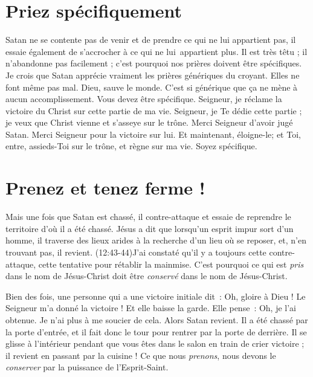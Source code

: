 \section{Priez sp\'ecifiquement}

Satan ne se contente pas de venir et de prendre ce qui ne lui appartient pas,
 il essaie également de s'accrocher à ce qui ne lui~appartient %
 plus.  Il est très têtu ; il n'abandonne pas facilement ;
 c'est pourquoi nos prières doivent être spécifiques.
 Je crois que Satan apprécie vraiment les prières génériques du croyant.
 Elles ne font même pas mal. \Og Dieu, sauve le monde. \Fg{}
 C'est si générique que ça ne mène à aucun accomplissement.
 Vous devez être spécifique. \Og Seigneur, je réclame la victoire du Christ
 sur cette partie de ma vie. Seigneur, je Te dédie cette partie ;
 je veux que Christ vienne et s'asseye sur le trône.
 Merci Seigneur d'avoir jugé Satan.
 Merci Seigneur pour la victoire sur lui.
 Et maintenant, éloigne-le;
 et Toi, entre, assieds-Toi sur le trône,
 et règne sur ma vie. \Fg{} Soyez spécifique.


\section{Prenez et tenez ferme !}

Mais une fois que Satan est chassé, il contre-attaque et essaie de reprendre
 le territoire d'où il a été chassé.
 Jésus a dit que lorsqu'un esprit impur sort d'un homme,
 il traverse des lieux arides à la recherche d'un lieu où se reposer,
 et, n'en trouvant pas, il revient.
 (12:43-44)J'ai constaté qu'il y a toujours cette contre-attaque,
 cette tentative pour rétablir la mainmise.
 C'est pourquoi ce qui est \emph{pris}
 dans le nom de Jésus-Christ doit être
 \emph{conservé} dans le nom de Jésus-Christ.

Bien des fois, une personne qui a une victoire initiale dit~:
 \Og Oh, gloire à Dieu ! Le Seigneur m'a donné la victoire ! \Fg{}
 Et elle baisse la garde. Elle pense~: \Og Oh, je l'ai obtenue.
 Je n'ai plus à me soucier de cela. \Fg{} Alors Satan revient.
 Il a été chassé par la porte d'entrée, et il fait donc le tour
 pour rentrer par la porte de derrière.
 Il se glisse à l'intérieur pendant que vous êtes dans le salon
 en train de crier victoire ; il revient en passant par la cuisine !
 Ce que nous \emph{prenons}, nous devons le \emph{conserver}
 par la puissance de l'Esprit-Saint.
\closechapter


